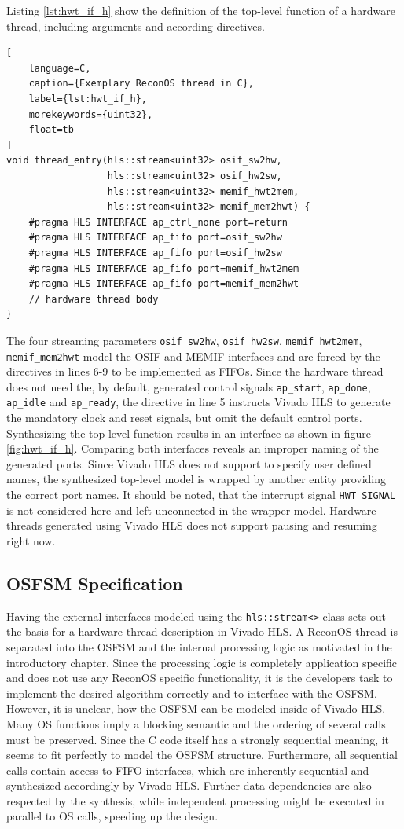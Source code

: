 Listing \ref{lst:hwt_if_h} show the definition of the top-level function of a
hardware thread, including arguments and according directives.
\begin{lstlisting}[
	language=C,
	caption={Exemplary ReconOS thread in C},
	label={lst:hwt_if_h},
	morekeywords={uint32},
	float=tb
]
void thread_entry(hls::stream<uint32> osif_sw2hw,
                  hls::stream<uint32> osif_hw2sw,
                  hls::stream<uint32> memif_hwt2mem,
                  hls::stream<uint32> memif_mem2hwt) {
	#pragma HLS INTERFACE ap_ctrl_none port=return
	#pragma HLS INTERFACE ap_fifo port=osif_sw2hw
	#pragma HLS INTERFACE ap_fifo port=osif_hw2sw
	#pragma HLS INTERFACE ap_fifo port=memif_hwt2mem
	#pragma HLS INTERFACE ap_fifo port=memif_mem2hwt
	// hardware thread body
}
\end{lstlisting}
The four streaming parameters \lstinline{osif_sw2hw}, \lstinline{osif_hw2sw},
\lstinline{memif_hwt2mem}, \lstinline{memif_mem2hwt} model the \ac{OSIF} and
\ac{MEMIF} interfaces and are forced by the directives in lines 6-9 to be
implemented as \acp{FIFO}. Since the hardware thread does not need the, by
default, generated control signals \lstinline{ap_start}, \lstinline{ap_done},
\lstinline{ap_idle} and \lstinline{ap_ready}, the directive in line 5
instructs Vivado HLS to generate the mandatory clock and reset signals, but
omit the default control ports. Synthesizing the top-level function results in
an interface as shown in figure \ref{fig:hwt_if_h}. Comparing both interfaces
reveals an improper naming of the generated ports. Since Vivado HLS does not
support to specify user defined names, the synthesized top-level model is
wrapped by another entity providing the correct port names. It should be
noted, that the interrupt signal \lstinline{HWT_SIGNAL} is not considered here
and left unconnected in the wrapper model. Hardware threads generated using
Vivado HLS does not support pausing and resuming right now.

\subsection{\acs{OSFSM} Specification}
Having the external interfaces modeled using the \lstinline{hls::stream<>}
class sets out the basis for a hardware thread description in Vivado HLS. A
ReconOS thread is separated into the \ac{OSFSM} and the internal processing
logic as motivated in the introductory chapter. Since the processing logic is
completely application specific and does not use any ReconOS specific
functionality, it is the developers task to implement the desired algorithm
correctly and to interface with the \ac{OSFSM}. However, it is unclear, how
the \ac{OSFSM} can be modeled inside of Vivado HLS. Many \ac{OS} functions
imply a blocking semantic and the ordering of several calls must be preserved.
Since the C code itself has a strongly sequential meaning, it seems to fit
perfectly to model the \ac{OSFSM} structure. Furthermore, all sequential calls
contain access to \ac{FIFO} interfaces, which are inherently sequential and
synthesized accordingly by Vivado HLS. Further data dependencies are also
respected by the synthesis, while independent processing might be executed in
parallel to \ac{OS} calls, speeding up the design.

